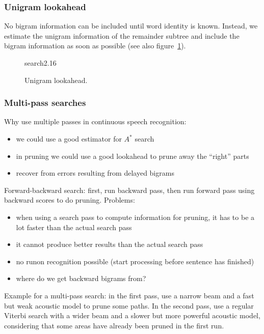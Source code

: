 \documentclass[11pt]{article}
\begin{document}
\vspace{10pt}

\subsubsection{Unigram lookahead}
No bigram information can be included until word identity is known. Instead, we estimate the unigram information of the remainder subtree and include the bigram information as soon as possible (see also figure~\ref{fig:unigramLookahead}).
\begin{figure}[htb]
    \begin{minipage}{\linewidth}
        \vspace{4cm}
        \hfill \scriptsize search2.16
    \end{minipage}
    \caption{\label{fig:unigramLookahead} Unigram lookahead.}
\end{figure}

\vspace{10pt}

\subsubsection{Multi-pass searches}
Why use multiple passes in continuous speech recognition:
\begin{itemize}
    \item we could use a good estimator for $A^{\ast}$ search
    \item in pruning we could use a good lookahead to prune away the ``right'' parts
    \item recover from errors resulting from delayed bigrams
\end{itemize}
Forward-backward search: first, run backward pass, then run forward pass using backward scores to do pruning. Problems:
\begin{itemize}
    \item when using a search pass to compute information for pruning, it has to be a lot faster than the actual search pass
    \item it cannot produce better results than the actual search pass
    \item no runon recognition possible (start processing before sentence has finished)
    \item where do we get backward bigrams from?
\end{itemize}
Example for a multi-pass search: in the first pass, use a narrow beam and a fast but weak acoustic model to prune some paths. In the second pass, use a regular Viterbi search with a wider beam and a slower but more powerful acoustic model, considering that some areas have already been pruned in the first run.
\end{document}
